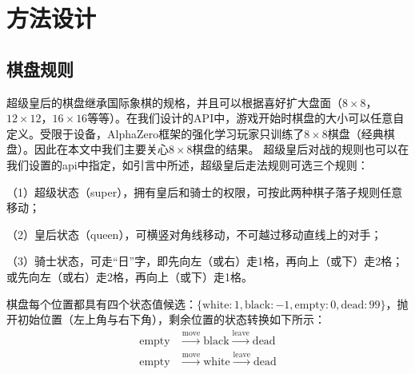 \chapter{方法设计}
\label{chap:algorithm}

\section{棋盘规则}
超级皇后的棋盘继承国际象棋的规格，并且可以根据喜好扩大盘面（$8\times8$，$12\times12$，$16\times16$等等）。在我们设计的API中，游戏开始时棋盘的大小可以任意自定义。受限于设备，AlphaZero框架的强化学习玩家只训练了$8\times8$棋盘（经典棋盘）。因此在本文中我们主要关心$8\times8$棋盘的结果。
超级皇后对战的规则也可以在我们设置的api中指定，如引言中所述，超级皇后走法规则可选三个规则：

（1）超级状态（super），拥有皇后和骑士的权限，可按此两种棋子落子规则任意移动；

（2）皇后状态（queen），可横竖对角线移动，不可越过移动直线上的对手；

（3）骑士状态，可走“日”字，即先向左（或右）走1格，再向上（或下）走2格；或先向左（或右）走2格，再向上（或下）走1格。

棋盘每个位置都具有四个状态值候选：$\{\text{white}:1, \text{black}:-1, \text{empty}:0, \text{dead}:99\}$，抛开初始位置（左上角与右下角），剩余位置的状态转换如下所示：
\begin{equation}
    \begin{aligned}
    \text{empty} &\stackrel{\mathrm{move}}{\longrightarrow} \text{black} \stackrel{\mathrm{leave}}{\longrightarrow} \text{dead} \\
    \text{empty} &\stackrel{\mathrm{move}}{\longrightarrow} \text{white} \stackrel{\mathrm{leave}}{\longrightarrow} \text{dead} 
    \end{aligned}
\end{equation}

